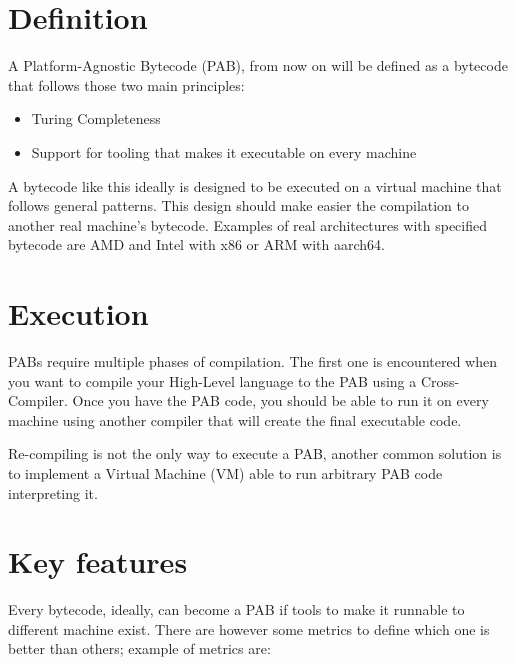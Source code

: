 \section{Definition}

A Platform-Agnostic Bytecode (PAB), from now on will be defined as a bytecode that follows those two main principles:
\begin{itemize}
    \item Turing Completeness
    \item Support for tooling that makes it executable on every machine
\end{itemize}

A bytecode like this ideally is designed to be executed on a virtual machine that follows general patterns. This design should make easier the compilation to another real machine's bytecode. Examples of real architectures with specified bytecode are AMD and Intel with x86 or ARM with aarch64. %

\section{Execution}

PABs require multiple phases of compilation. The first one is encountered when you want to compile your High-Level language to the PAB using a Cross-Compiler. Once you have the PAB code, you should be able to run it on every machine using another compiler that will create the final executable code.

Re-compiling is not the only way to execute a PAB, another common solution is to implement a Virtual Machine (VM) able to run arbitrary PAB code interpreting it.

\section{Key features}

Every bytecode, ideally, can become a PAB if tools to make it runnable to different machine exist. There are however some metrics to define which one is better than others; example of metrics are:

